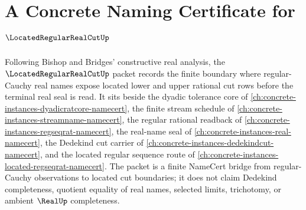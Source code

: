 \chapter{A Concrete Naming Certificate for $\LocatedRegularRealCutUp$}
\label{ch:concrete-instances-located-regular-real-cut-namecert}

Following Bishop and Bridges' constructive real analysis, the $\LocatedRegularRealCutUp$ packet records the finite boundary where regular-Cauchy real names expose located lower and upper rational cut rows before the terminal real seal is read. It sits beside the dyadic tolerance core of \autoref{ch:concrete-instances-dyadicratcore-namecert}, the finite stream schedule of \autoref{ch:concrete-instances-streamname-namecert}, the regular rational readback of \autoref{ch:concrete-instances-regseqrat-namecert}, the real-name seal of \autoref{ch:concrete-instances-real-namecert}, the Dedekind cut carrier of \autoref{ch:concrete-instances-dedekindcut-namecert}, and the located regular sequence route of \autoref{ch:concrete-instances-located-regseqrat-namecert}. The packet is a finite NameCert bridge from regular-Cauchy observations to located cut boundaries; it does not claim Dedekind completeness, quotient equality of real names, selected limits, trichotomy, or ambient $\RealUp$ completeness.


